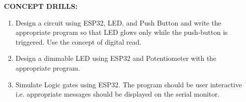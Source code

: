\documentclass[12pt,a4paper]{article}
\begin{document}
\textbf{\large CONCEPT DRILLS:}
\vspace{-6mm}
\begin{enumerate}
 \setlength\itemsep{-0.3em}
\item Design a circuit using  ESP32, LED, and Push Button and write the appropriate program so that LED glows only while the push-button is triggered. Use the concept of digital read.
\item Design a dimmable LED using  ESP32 and Potentiometer with the appropriate program. 
\item Simulate Logic gates using ESP32. The program should be user interactive i.e. appropriate messages should be displayed on the serial monitor.
\end{enumerate}
\end{document}
